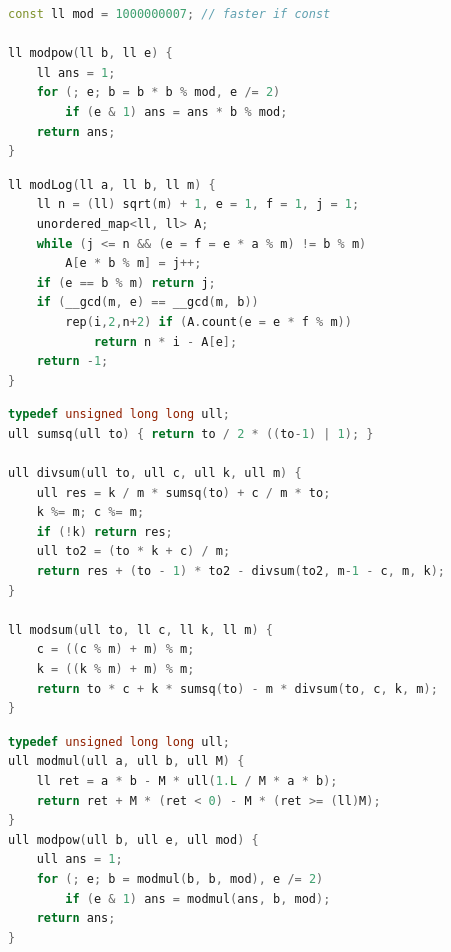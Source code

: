 \begin{multicols}{\Columns}
\begin{lstlisting}[language=C++]
const ll mod = 1000000007; // faster if const

ll modpow(ll b, ll e) {
	ll ans = 1;
	for (; e; b = b * b % mod, e /= 2)
		if (e & 1) ans = ans * b % mod;
	return ans;
}
\end{lstlisting}

\begin{lstlisting}[language=C++]
ll modLog(ll a, ll b, ll m) {
	ll n = (ll) sqrt(m) + 1, e = 1, f = 1, j = 1;
	unordered_map<ll, ll> A;
	while (j <= n && (e = f = e * a % m) != b % m)
		A[e * b % m] = j++;
	if (e == b % m) return j;
	if (__gcd(m, e) == __gcd(m, b))
		rep(i,2,n+2) if (A.count(e = e * f % m))
			return n * i - A[e];
	return -1;
}
\end{lstlisting}

\begin{lstlisting}[language=C++]
typedef unsigned long long ull;
ull sumsq(ull to) { return to / 2 * ((to-1) | 1); }

ull divsum(ull to, ull c, ull k, ull m) {
	ull res = k / m * sumsq(to) + c / m * to;
	k %= m; c %= m;
	if (!k) return res;
	ull to2 = (to * k + c) / m;
	return res + (to - 1) * to2 - divsum(to2, m-1 - c, m, k);
}

ll modsum(ull to, ll c, ll k, ll m) {
	c = ((c % m) + m) % m;
	k = ((k % m) + m) % m;
	return to * c + k * sumsq(to) - m * divsum(to, c, k, m);
}
\end{lstlisting}

\begin{lstlisting}[language=C++]
typedef unsigned long long ull;
ull modmul(ull a, ull b, ull M) {
	ll ret = a * b - M * ull(1.L / M * a * b);
	return ret + M * (ret < 0) - M * (ret >= (ll)M);
}
ull modpow(ull b, ull e, ull mod) {
	ull ans = 1;
	for (; e; b = modmul(b, b, mod), e /= 2)
		if (e & 1) ans = modmul(ans, b, mod);
	return ans;
}
\end{lstlisting}


\end{multicols}
